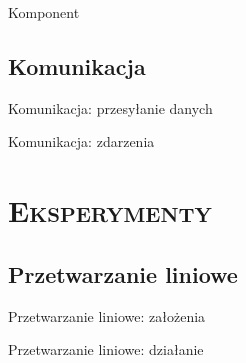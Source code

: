 \documentclass[xcolor=x11names,compress]{beamer}
\renewcommand{\(}{\begin{columns}}
\renewcommand{\)}{\end{columns}}
\newcommand{\<}[1]{\begin{column}{#1}}
\renewcommand{\>}{\end{column}}
\begin{document}
\begin{frame}{Komponent}

\end{frame}

\subsection{Komunikacja}

\begin{frame}{Komunikacja: przesyłanie danych}

\end{frame}





\begin{frame}{Komunikacja: zdarzenia}

\end{frame}

%

\section{\scshape Eksperymenty}
\subsection{Przetwarzanie liniowe}
\begin{frame}{Przetwarzanie liniowe: założenia}


\end{frame}

\begin{frame}{Przetwarzanie liniowe: działanie}

\end{frame}
\end{document}
